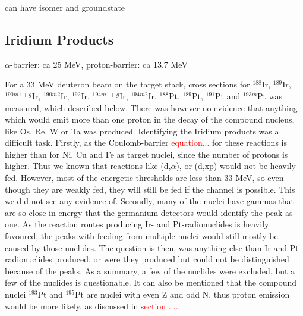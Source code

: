 \subsubsection{}
\hspace{6cm}
\subsubsection{}
\hspace{6cm}
\subsubsection{}
can have isomer and groundstate \hspace{6cm}


\subsection{Iridium Products}
$\alpha$-barrier: ca 25 MeV, proton-barrier: ca 13.7 MeV

For a 33 MeV deuteron beam on the target stack, cross sections for $^{188}$Ir, $^{189}$Ir,  $^{190m1+g}$Ir, $^{190m2}$Ir, $^{192}$Ir, $^{194m1+g}$Ir, $^{194m2}$Ir, $^{188}$Pt, $^{189}$Pt, $^{191}$Pt and $^{193m}$Pt was measured, which described below. There was however no evidence that anything which would emit more than one proton in the decay of the compound nucleus, like Os, Re, W or Ta was produced. Identifying the Iridium products was a difficult task. Firstly, as the Coulomb-barrier \textcolor{red}{equation...} for these reactions is higher than for Ni, Cu and Fe as target nuclei, since the number of protons is higher. Thus we known that reactions like (d,$\alpha$), or (d,xp) would not be heavily fed. However, most of the energetic thresholds are less than 33 MeV, so even though they are weakly fed, they will still be fed if the channel is possible. This we did not see any evidence of. Secondly, many of the nuclei have gammas that are so close in energy that the germanium detectors would identify the peak as one. As the reaction routes producing Ir- and Pt-radionuclides is heavily favoured, the peaks with feeding from multiple nuclei would still mostly be caused by those nuclides. The question is then, was anything else than Ir and Pt radionuclides produced, or were they produced but could not be distinguished because of the peaks. As a summary, a few of the nuclides were excluded, but a few of the nuclides is questionable. It can also be mentioned that the compound nuclei $^{193}$Pt and $^{195}$Pt are nuclei with even Z and odd N, thus proton emission would be more likely, as discussed in \textcolor{red}{section ....}.  \\

